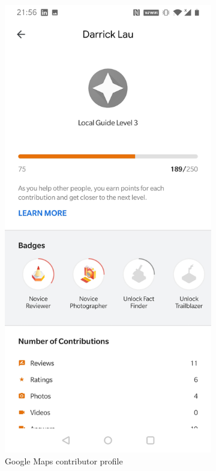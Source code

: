 \begin{figure}[htb!]
    \begin{center}
        \begin{subfigure}{.3\textwidth}
            \centering
            \includegraphics[width=0.8\linewidth]{images/gmaps_gamified_home.jpg}
            \caption{Google Maps contributor profile}
            \label{fig:gmaps_gamify_home}
        \end{subfigure}%
        \begin{subfigure}{.3\textwidth}
            \centering

\end{subfigure}
\end{center}
\end{figure}
